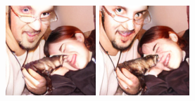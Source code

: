 \begin{figure}[h]
\begin{minipage}{0.15\textwidth}
    \end{minipage}
    \begin{minipage}{0.15\textwidth}
        \centering
        \includegraphics[width=\linewidth]{material/65k/281.png}
    \end{minipage}
    \begin{minipage}{0.15\textwidth}
        \centering
        \includegraphics[width=\linewidth]{material/262k/281.png}
    \end{minipage}


\end{figure}
